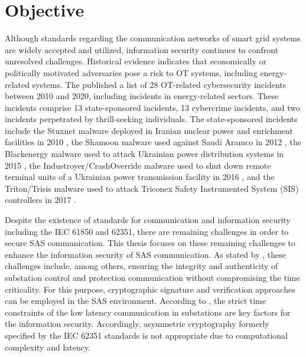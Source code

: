 \section{Objective}
\label{sec:introduction:objective}
Although standards regarding the communication networks of smart grid systems are widely accepted and utilized, information security continues to confront unresolved challenges.
Historical evidence indicates that economically or politically motivated adversaries pose a risk to OT systems, including energy-related systems.
The \citeauthor{canada2021} \cite{canada2021} published a list of 28 OT-related cybersecurity incidents between 2010 and 2020, including incidents in energy-related sectors.
These incidents comprise 13 state-sponsored incidents, 13 cybercrime incidents, and two incidents perpetrated by thrill-seeking individuals.
The state-sponsored incidents include the Stuxnet malware deployed in Iranian nuclear power and enrichment facilities in 2010 \cite{bbc2010}, the Shamoon malware used against Saudi Aramco in 2012 \cite{reuters2012}, the Blackenergy malware used to attack Ukrainian power distribution systems in 2015 \cite{cisa2021a}, the Industroyer/CrashOverride malware used to shut down remote terminal units of a Ukrainian power transmission facility in 2016 \cite{reuters2016,cisa2021b}, and the Triton/Trisis malware used to attack Triconex Safety Instrumented System (SIS) controllers in 2017 \cite{johnson2017}.

Despite the existence of standards for communication and information security including the IEC 61850 and 62351, there are remaining challenges in order to secure SAS communication.
This thesis focuses on these remaining challenges to enhance the information security of SAS communication.
As stated by \citeauthor{Ishchenko2018} \cite{Ishchenko2018}, these challenges include, among others, ensuring the integrity and authenticity of substation control and protection communication without compromising the time criticality.
For this purpose, cryptographic signature and verification approaches can be employed in the SAS environment.
According to \citeauthor{Elbez2019} \cite{Elbez2019}, the strict time constraints of the low latency communication in substations are key factors for the information security.
Accordingly, asymmetric cryptography formerly specified by the IEC 62351 standards is not appropriate due to computational complexity and latency.

